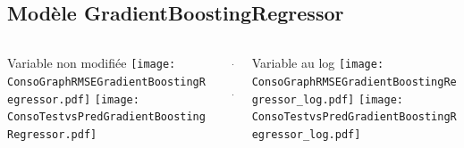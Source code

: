 \documentclass[8pt,aspectratio=169,hyperref={unicode=true}]{beamer}
\begin{document}
\subsection{Modèle GradientBoostingRegressor}
\begin{frame}{\insertsubsection}
  \begin{columns}[t]
    \begin{column}{.33\textwidth}
      \centering Variable non modifiée
      \texttt{[image: ConsoGraphRMSEGradientBoostingRegressor.pdf]}
      \texttt{[image: ConsoTestvsPredGradientBoostingRegressor.pdf]}
    \end{column}
    \begin{column}{.33\textwidth}
      $\Longleftarrow$
      \scriptsize
      {\centering
        }
      

      \normalsize
      $\Longleftarrow$

      \raggedleft{$\Longrightarrow$}
      \scriptsize
      {\centering
        }
      

      \normalsize
      \raggedleft{$\Longrightarrow$}
    \end{column}
    \begin{column}{.33\textwidth}
      \centering Variable au log
      \texttt{[image: ConsoGraphRMSEGradientBoostingRegressor\_log.pdf]}
      \texttt{[image: ConsoTestvsPredGradientBoostingRegressor\_log.pdf]}
    \end{column}
  \end{columns}
\end{frame}
\end{document}
